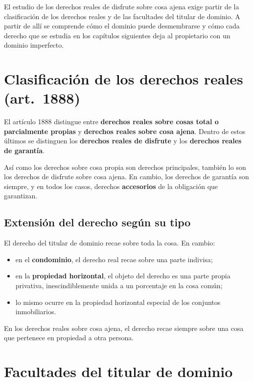 \documentclass[12pt,oneside]{book}
\begin{document}
El estudio de los derechos reales de disfrute sobre cosa ajena exige partir de la clasificación de los derechos reales y de las facultades del titular de dominio. A partir de allí se comprende cómo el dominio puede desmembrarse y cómo cada derecho que se estudia en los capítulos siguientes deja al propietario con un dominio imperfecto.

\section{Clasificación de los derechos reales (art.~1888)}

El artículo 1888 distingue entre \textbf{derechos reales sobre cosas total o parcialmente propias} y \textbf{derechos reales sobre cosa ajena}. Dentro de estos últimos se distinguen los \textbf{derechos reales de disfrute} y los \textbf{derechos reales de garantía}.

Así como los derechos sobre cosa propia son derechos principales, también lo son los derechos de disfrute sobre cosa ajena. En cambio, los derechos de garantía son siempre, y en todos los casos, derechos \textbf{accesorios} de la obligación que garantizan.

\subsection{Extensión del derecho según su tipo}

El derecho del titular de dominio recae sobre toda la cosa. En cambio:

\begin{itemize}
    \item en el \textbf{condominio}, el derecho real recae sobre una parte indivisa;
    \item en la \textbf{propiedad horizontal}, el objeto del derecho es una parte propia privativa, inescindiblemente unida a un porcentaje en la cosa común;
    \item lo mismo ocurre en la propiedad horizontal especial de los conjuntos inmobiliarios.
\end{itemize}

En los derechos reales sobre cosa ajena, el derecho recae siempre sobre una cosa que pertenece en propiedad a otra persona.

\section{Facultades del titular de dominio}
\end{document}
